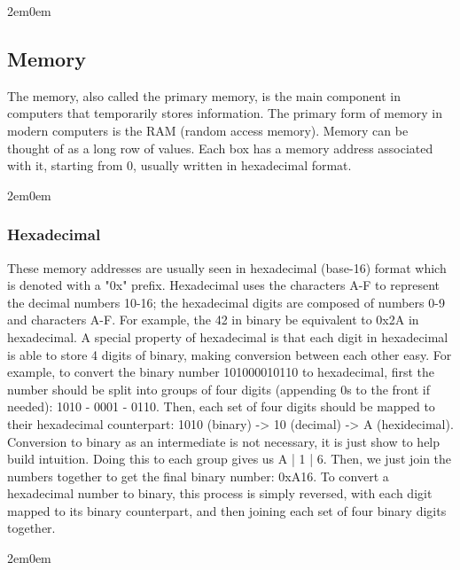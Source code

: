 \documentclass[openany, 12px]{book}
\begin{document}
\begin{adjustwidth}{2em}{0em}
\subsection{Memory} 
The memory, also called the primary memory, is the main component in computers that temporarily stores information. The primary form of memory in modern computers is the RAM (random access memory). Memory can be thought of as a long row of values. Each box has a memory address associated with it, starting from 0, usually written in hexadecimal format.
\begin{adjustwidth}{2em}{0em}
\subsubsection{Hexadecimal}
These memory addresses are usually seen in hexadecimal (base-16) format which is denoted with a "0x" prefix. Hexadecimal uses the characters A-F to represent the decimal numbers 10-16; the hexadecimal digits are composed of numbers 0-9 and characters A-F. For example, the 42 in binary be equivalent to 0x2A in hexadecimal. A special property of hexadecimal is that each digit in hexadecimal is able to store 4 digits of binary, making conversion between each other easy. For example, to convert the binary number 101000010110 to hexadecimal, first the number should be split into groups of four digits (appending 0s to the front if needed): 1010 - 0001 - 0110. Then, each set of four digits should be mapped to their hexadecimal counterpart: 1010 (binary) -> 10 (decimal) -> A (hexidecimal). Conversion to binary as an intermediate is not necessary, it is just show to help build intuition. Doing this to each group gives us A | 1 | 6. Then, we just join the numbers together to get the final binary number: 0xA16. To convert a hexadecimal number to binary, this process is simply reversed, with each digit mapped to its binary counterpart, and then joining each set of four binary digits together.
\end{adjustwidth}
\begin{adjustwidth}{2em}{0em}

\end{adjustwidth}
\end{adjustwidth}
\end{document}
